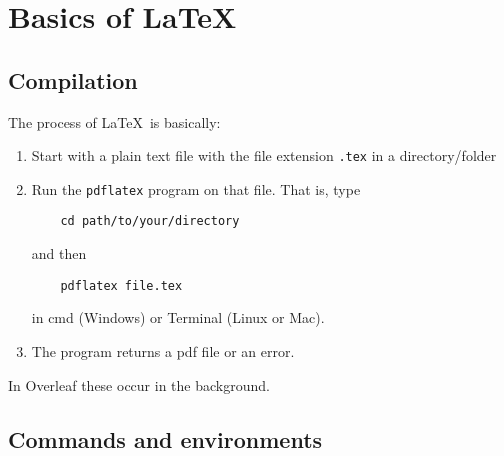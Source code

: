 \documentclass[a4paper,11pt]{scrartcl}\usepackage[]{graphicx}\usepackage[]{color}
\begin{document}
 \section{Basics of \textrm{\LaTeX}}
 \subsection{Compilation}
 The process of \LaTeX\ is basically:
 \begin{enumerate}
  \item Start with a plain text file with the file extension \verb=.tex= in a directory/folder
  \item Run the \verb=pdflatex= program on that file. That is, type 
  \begin{lstlisting}
    cd path/to/your/directory
  \end{lstlisting}
  and then 
  \begin{lstlisting}
    pdflatex file.tex
  \end{lstlisting}
  in cmd (Windows) or Terminal (Linux or Mac).
  \item The program returns a pdf file or an error.
 \end{enumerate}
 In Overleaf these occur in the background.

 
 \subsection{Commands and environments}
\end{document}
